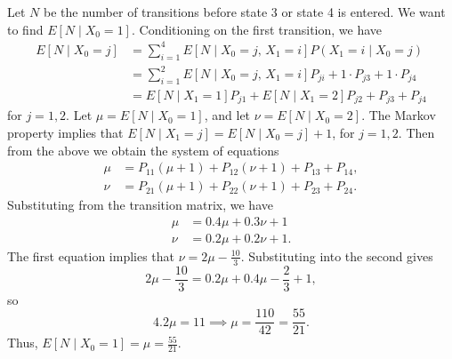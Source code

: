\documentclass{homework}
\begin{document}
\begin{alphaparts}
		\questionpart Let $N$ be the number of transitions before state 3 or state 4 is entered. We want to find $E[N \mid X_0 = 1]$. Conditioning on the first transition, we have
		\begin{align*}
			E[N \mid X_0 = j] &= \sum_{i=1}^4 E[N \mid X_0=j,\, X_1=i]P(X_1=i \mid X_0=j) \\
			&= \sum_{i=1}^2E[N \mid X_0=j,\, X_1=i]P_{ji} + 1\cdot P_{j3} + 1\cdot P_{j4} \\
			&= E[N \mid X_1=1]P_{j1} + E[N \mid X_1=2]P_{j2} + P_{j3} + P_{j4}
		\end{align*}
		for $j = 1,2$. Let $\mu = E[N \mid X_0 = 1]$, and let $\nu = E[N \mid X_0=2]$. The Markov property implies that $E[N \mid X_1=j] = E[N \mid X_0=j] + 1$, for $j=1,2$. Then from the above we obtain the system of equations
		\begin{align*}
			\mu &= P_{11}(\mu+1) + P_{12}(\nu+1) + P_{13} + P_{14}, \\
			\nu &= P_{21}(\mu+1) + P_{22}(\nu+1) + P_{23} + P_{24}.
		\end{align*}
		Substituting from the transition matrix, we have
		\begin{align*}
			\mu &= 0.4\mu + 0.3\nu + 1 \\
			\nu &= 0.2\mu + 0.2\nu + 1.
		\end{align*}
		The first equation implies that $\nu = 2\mu - \frac{10}{3}$. Substituting into the second gives
		\begin{equation*}
			2\mu - \frac{10}{3} = 0.2\mu + 0.4\mu - \frac{2}{3} + 1,
		\end{equation*}
		so
		\begin{equation*}
			4.2\mu = 11 \implies \mu = \frac{110}{42} = \frac{55}{21}.
		\end{equation*}
		Thus, $E[N \mid X_0=1] = \mu = \frac{55}{21}$.
	\end{alphaparts}
\end{document}
